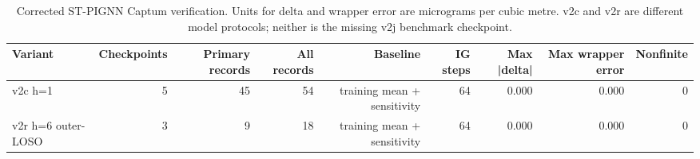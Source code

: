 \begin{table}[t]
\centering
\footnotesize
\caption{Corrected ST-PIGNN Captum verification. Units for delta and wrapper error are micrograms per cubic metre. v2c and v2r are different model protocols; neither is the missing v2j benchmark checkpoint.}
\label{tab:t06}
\begin{tabular}{lrrrrrrrr}
\hline
Variant & Checkpoints & Primary records & All records & Baseline & IG steps & Max |delta| & Max wrapper error & Nonfinite \\
\hline
v2c h=1 & 5 & 45 & 54 & training mean + sensitivity & 64 & 0.000 & 0.000 & 0 \\
v2r h=6 outer-LOSO & 3 & 9 & 18 & training mean + sensitivity & 64 & 0.000 & 0.000 & 0 \\
\hline
\end{tabular}
\end{table}
